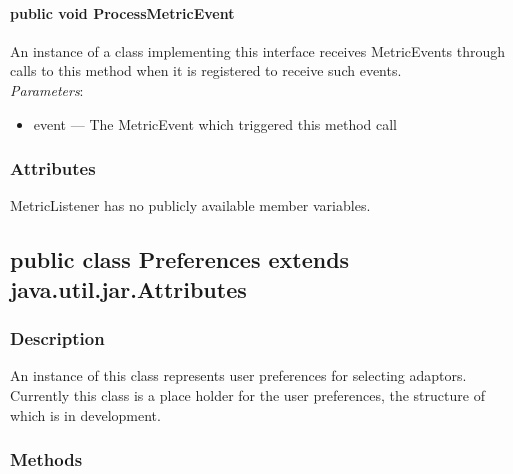 \documentclass[$Date: 2003/06/26 19:29:31 $]{glabarticle}
\begin{document}
\paragraph{public void ProcessMetricEvent}

An instance of a class implementing this interface receives MetricEvents through calls to this method when
it is registered to receive such events. \\

\textit{Parameters}:
\begin{itemize}
\item[] event --- The MetricEvent which triggered this method call
\end{itemize}


\subsubsection{Attributes}

MetricListener has no publicly available member variables. 


\newpage

\subsection{public class Preferences extends java.util.jar.Attributes}


\subsubsection{Description}

An instance of this class represents user preferences for
selecting adaptors. Currently this class is a place holder for the
user preferences, the structure of which is in development.


\subsubsection{Methods}
\end{document}
